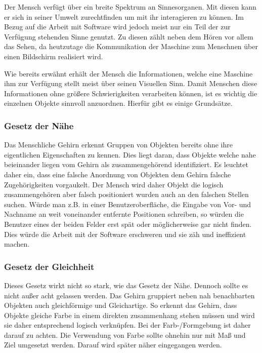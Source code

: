 Der Mensch verfügt über ein breite Spektrum an Sinnesorganen. Mit diesen kann er 
sich in seiner Umwelt zurechtfinden um mit ihr interagieren zu können. Im Bezug auf die 
Arbeit mit Software wird jedoch meist nur ein Teil der zur Verfügung stehenden Sinne genutzt. 
Zu diesen zählt neben dem Hören vor allem das Sehen, da heutzutage die Kommunikation 
der Maschine zum Menschnen über einen Bildschirm realisiert wird. 

Wie bereits erwähnt erhält der Mensch die Informationen, welche eine Maschine ihm 
zur Verfügung stellt meist über seinen Visuellen Sinn. Damit Menschen diese Informationen ohne 
größere Schwierigkeiten verarbeiten können, ist es wichtig die einzelnen Objekte sinnvoll anzuordnen. 
Hierfür gibt es einige Grundsätze.

\subsubsection{Gesetz der Nähe}  

Das Menschliche Gehirn erkennt Gruppen von Objekten bereits ohne ihre eigentlichen Eigenschaften zu kennen. 
Dies liegt daran, dass Objekte welche nahe beieinander liegen vom Gehirn als zusammengehörend identifiziert. 
Es leuchtet daher ein, dass eine falsche Anordnung von Objekten dem Gehirn falsche Zugehörigkeiten vorgaukelt. 
Der Mensch wird daher Objekt die logisch zusammengehören aber falsch positioniert wurden auch an den 
falschen Stellen suchen. Würde man z.B. in einer Benutzeroberfläche, die
Eingabe von Vor- und Nachname an weit voneinander entfernte Positionen
schreiben, so würden die Benutzer eines der beiden Felder erst spät oder
möglicherweise gar nicht finden. Dies würde die Arbeit mit der
Software erschweren und sie zäh und ineffizient machen.

\subsubsection{Gesetz der Gleichheit}

Dieses Gesetz wirkt nicht so stark, wie das Gesetz der Nähe. Dennoch sollte es
nicht außer acht gelassen werden. Das Gehirn gruppiert neben nah benachbarten
Objekten auch gleichförmige und Gleichartige. So erkennt das Gehirn, dass
Objekte gleiche Farbe in einem direkten zusammenhang stehen müssen und wird sie
daher entsprechend logisch verknüpfen. Bei der Farb-/Formgebung ist daher darauf
zu achten. Die Verwendung von Farbe sollte ohnehin nur mit Maß und Ziel
umgesetzt werden. Darauf wird später näher eingegangen werden.

